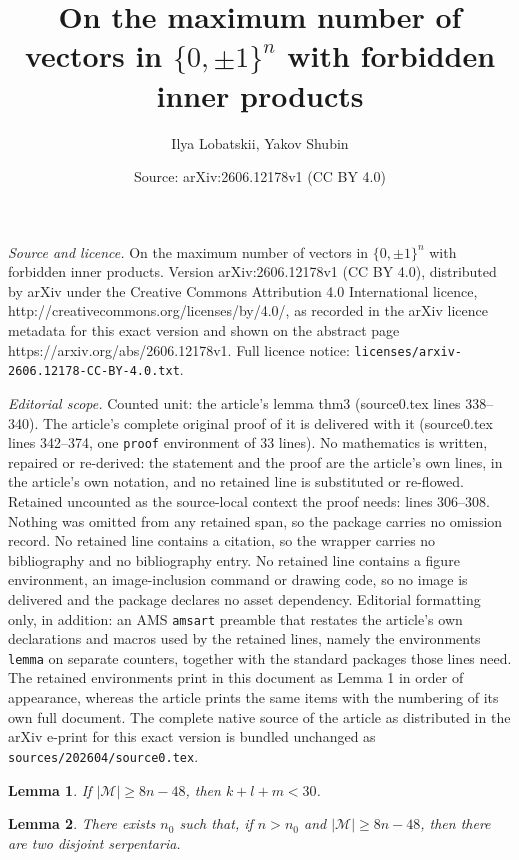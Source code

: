 \documentclass[10pt,a4paper]{amsart}
\title{On the maximum number of vectors in $\{0,\pm1\}^n$ with forbidden inner products}
\author{Ilya Lobatskii, Yakov Shubin}
\date{Source: arXiv:2606.12178v1 (CC BY 4.0)}
\newtheorem{lemma}{Lemma}
\newcommand{\M}{\mathcal{M}}
\begin{document}
\maketitle

\noindent\emph{Source and licence.} On the maximum number of vectors in $\{0,\pm1\}^n$ with forbidden inner products. Version arXiv:2606.12178v1 (CC BY 4.0), distributed by arXiv under the Creative Commons Attribution 4.0 International licence, http://creativecommons.org/licenses/by/4.0/, as recorded in the arXiv licence metadata for this exact version and shown on the abstract page https://arxiv.org/abs/2606.12178v1. Full licence notice: \texttt{licenses/arxiv-2606.12178-CC-BY-4.0.txt}.\par\smallskip

\noindent\textit{Editorial scope.} Counted unit: the article's lemma thm3 (source0.tex lines 338--340). The article's complete original proof of it is delivered with it (source0.tex lines 342--374, one \texttt{proof} environment of 33 lines). No mathematics is written, repaired or re-derived: the statement and the proof are the article's own lines, in the article's own notation, and no retained line is substituted or re-flowed.  Retained uncounted as the source-local context the proof needs: lines 306--308.  Nothing was omitted from any retained span, so the package carries no omission record.  No retained line contains a citation, so the wrapper carries no bibliography and no bibliography entry.  No retained line contains a figure environment, an image-inclusion command or drawing code, so no image is delivered and the package declares no asset dependency.  Editorial formatting only, in addition: an AMS \texttt{amsart} preamble that restates the article's own declarations and macros used by the retained lines, namely the environments \texttt{lemma} on separate counters, together with the standard packages those lines need.  The retained environments print in this document as Lemma 1 in order of appearance, whereas the article prints the same items with the numbering of its own full document.  The complete native source of the article as distributed in the arXiv e-print for this exact version is bundled unchanged as \texttt{sources/202604/source0.tex}.
\begin{lemma}\label{mainlem}
    If $|\M| \geqslant 8n-48$, then $k+l+m<30$.
\end{lemma}

\begin{lemma}\label{thm3}
    There exists $n_0$ such that, if $n>n_0$ and $|\M| \geqslant 8n-48$, then there are two disjoint serpentaria.
\end{lemma}
\end{document}
